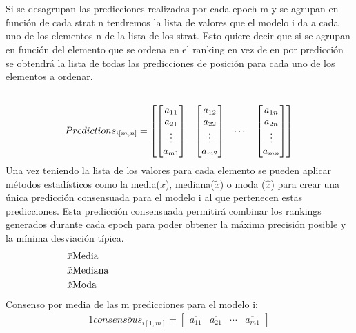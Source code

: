 \\ \\
Si se desagrupan las predicciones realizadas por cada epoch m y se agrupan en función de cada strat n tendremos la lista de valores que el modelo i da a cada uno de los elementos n de la lista de los strat. Esto quiere decir que si se agrupan en función del elemento que se ordena en el ranking en vez de en por predicción se obtendrá la lista de todas las predicciones de posición para cada uno de los elementos a ordenar.
\begin{alignat*}{1}
\parbox[t]{8cm}{\raggedright }\nonumber & \\
Predictions_{i[m,n]}= \begin{bmatrix}
\begin{bmatrix} a_{11} \\ a_{21} \\ \vdots \\ a_{m1} \end{bmatrix} 
& \begin{bmatrix} a_{12} \\ a_{22} \\ \vdots \\ a_{m2} \end{bmatrix} 
& \cdots
& \begin{bmatrix} a_{1n} \\ a_{2n} \\ \vdots \\ a_{mn} \end{bmatrix} 
\end{bmatrix}
\end{alignat*}
Una vez teniendo la lista de los valores para cada elemento se pueden aplicar métodos estadísticos como la media(\(\bar{x}\)), mediana(\(\tilde{x}\)) o moda (\(\hat{x}\)) para crear una única predicción consensuada para el modelo i al que pertenecen estas predicciones. Esta predicción consensuada permitirá combinar los rankings generados durante cada epoch para poder obtener la máxima precisión posible y la mínima desviación típica.
\begin{alignat*}{2}
\bar{x}   &  \parbox[t]{8cm}{\raggedright Media} \nonumber \\
\tilde{x} & \parbox[t]{8cm}{\raggedright Mediana} \nonumber \\
\hat{x}   & \parbox[t]{8cm}{\raggedright Moda} \nonumber
\end{alignat*}
Consenso por media de las m predicciones para el modelo i:
\begin{alignat*}{1}
\overline{consensous_{i[1,m]}}= \begin{bmatrix} \overline{a_{11}} &  \overline{a_{21}}  &  \cdots   & \overline{a_{m1}} \end{bmatrix} 
\end{alignat*}
